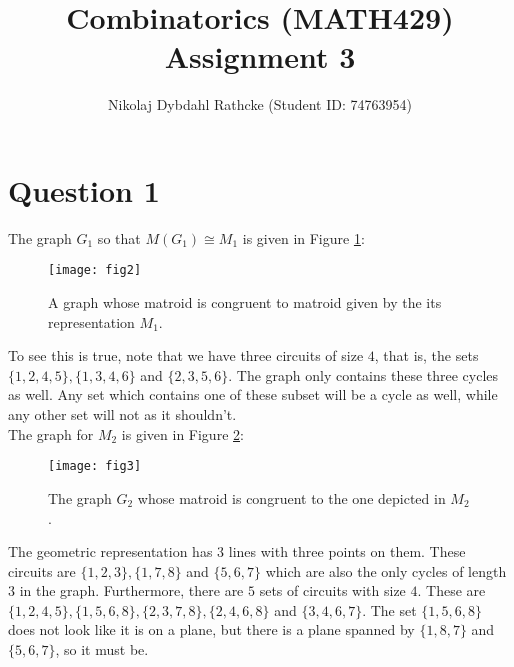 \documentclass[a4paper, fleqn]{article}
\author{Nikolaj Dybdahl Rathcke (Student ID: 74763954)}
\title{Combinatorics (MATH429) \\ Assignment 3}
\begin{document}
\maketitle

\section*{Question 1}
The graph $G_1$ so that $M(G_1)\cong M_1$ is given in Figure \ref{fig2}:
\begin{figure}[H]
  \centering
  \texttt{[image: fig2]}
  \caption{A graph whose matroid is congruent to matroid given by the its representation
  $M_1$.}
  \label{fig2}
\end{figure}
To see this is true, note that we have three circuits of size $4$, that is, the sets
$\{1,2,4,5\},\{1,3,4,6\}$ and $\{2,3,5,6\}$. The graph only contains these three cycles
as well. Any set which contains one of these subset will be a cycle as well, while any
other set will not as it shouldn't. \\
The graph for $M_2$ is given in Figure \ref{fig3}:
\begin{figure}[H]
  \centering
  \texttt{[image: fig3]}
  \caption{The graph $G_2$ whose matroid is congruent to the one depicted in $M_2$.}
  \label{fig3}
\end{figure}
The geometric representation has $3$ lines with three points on them. These circuits are
$\{1,2,3\}, \{1,7,8\}$ and $\{5,6,7\}$ which are also the only cycles of length $3$ in the
graph. Furthermore, there are $5$ sets of circuits with size $4$. These are
$\{1,2,4,5\},\{1,5,6,8\},\{2,3,7,8\},\{2,4,6,8\}$ and $\{3,4,6,7\}$. The set
$\{1,5,6,8\}$ does not look like it is on a plane, but there is a plane spanned by
$\{1,8,7\}$ and $\{5,6,7\}$, so it must be.
\end{document}
